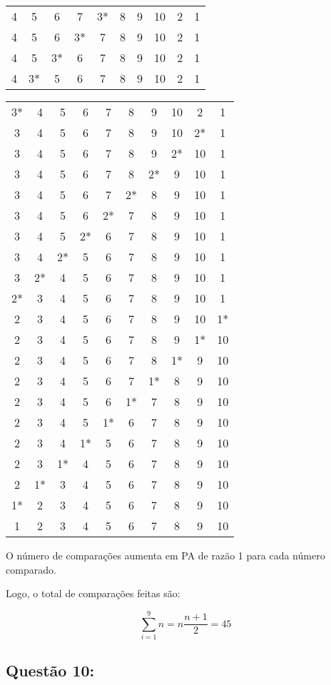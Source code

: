 \documentclass[a4paper,11pt]{article}
\begin{document}
\begin{center}
\begin{tabular}{cccccccccc}
4 & 5 & 6 & 7 & 3* & 8 & 9 & 10 & 2 & 1 \\
4 & 5 & 6 & 3* & 7 & 8 & 9 & 10 & 2 & 1 \\
4 & 5 & 3* & 6 & 7 & 8 & 9 & 10 & 2 & 1 \\
4 & 3* & 5 & 6 & 7 & 8 & 9 & 10 & 2 & 1 \\
\end{tabular}
\begin{tabular}{cccccccccc}
3* & 4 & 5 & 6 & 7 & 8 & 9 & 10 & 2 & 1 \\
3 & 4 & 5 & 6 & 7 & 8 & 9 & 10 & 2* & 1 \\
3 & 4 & 5 & 6 & 7 & 8 & 9 & 2* & 10 & 1 \\
3 & 4 & 5 & 6 & 7 & 8 & 2* & 9 & 10 & 1 \\
3 & 4 & 5 & 6 & 7 & 2* & 8 & 9 & 10 & 1 \\
3 & 4 & 5 & 6 & 2* & 7 & 8 & 9 & 10 & 1 \\
3 & 4 & 5 & 2* & 6 & 7 & 8 & 9 & 10 & 1 \\
3 & 4 & 2* & 5 & 6 & 7 & 8 & 9 & 10 & 1 \\
3 & 2* & 4 & 5 & 6 & 7 & 8 & 9 & 10 & 1 \\
2* & 3 & 4 & 5 & 6 & 7 & 8 & 9 & 10 & 1 \\
2 & 3 & 4 & 5 & 6 & 7 & 8 & 9 & 10 & 1* \\
2 & 3 & 4 & 5 & 6 & 7 & 8 & 9 & 1* & 10 \\
2 & 3 & 4 & 5 & 6 & 7 & 8 & 1* & 9 & 10 \\
2 & 3 & 4 & 5 & 6 & 7 & 1* & 8 & 9 & 10 \\
2 & 3 & 4 & 5 & 6 & 1* & 7 & 8 & 9 & 10 \\
2 & 3 & 4 & 5 & 1* & 6 & 7 & 8 & 9 & 10 \\
2 & 3 & 4 & 1* & 5 & 6 & 7 & 8 & 9 & 10 \\
2 & 3 & 1* & 4 & 5 & 6 & 7 & 8 & 9 & 10 \\
2 & 1* & 3 & 4 & 5 & 6 & 7 & 8 & 9 & 10 \\
1* & 2 & 3 & 4 & 5 & 6 & 7 & 8 & 9 & 10 \\
1 & 2 & 3 & 4 & 5 & 6 & 7 & 8 & 9 & 10
\end{tabular}
\end{center}

O número de comparações aumenta em PA de razão 1 para cada número comparado. 

Logo, o total de comparações feitas são:

\[ \sum_{i=1}^9 n = n \frac{n+1}{2} = 45\]


\subsection*{Questão 10:}
\end{document}
